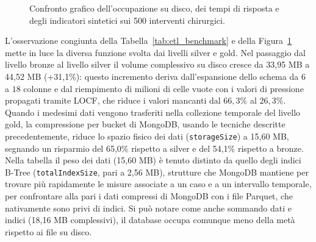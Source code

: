 \begin{table}[ht]
\centering
{}
\caption{Confronto sperimentale di spazio su disco, latenza di interrogazione e valori mancanti sui 500 casi clinici.}
\label{tab:etl_benchmark}
\end{table}

\begin{figure}[!htbp]
    \centering
    \resizebox{\textwidth}{!}{}
    \caption{Confronto grafico dell'occupazione su disco, dei tempi di risposta e degli indicatori sintetici sui 500 interventi chirurgici.}
    \label{fig:etl_benchmark}
\end{figure}

L'osservazione congiunta della Tabella~\ref{tab:etl_benchmark} e della Figura~\ref{fig:etl_benchmark} mette in luce la diversa funzione svolta dai livelli silver e gold. Nel passaggio dal livello bronze al livello silver il volume complessivo su disco cresce da 33,95 MB a 44,52 MB (+31,1\%): questo incremento deriva dall'espansione dello schema da $6$ a $18$ colonne e dal riempimento di milioni di celle vuote con i valori di pressione propagati tramite LOCF, che riduce i valori mancanti dal $66,3\%$ al $26,3\%$. Quando i medesimi dati vengono trasferiti nella collezione temporale del livello gold, la compressione per bucket di MongoDB, usando le tecniche descritte precedentemente, riduce lo spazio fisico dei dati (\texttt{storageSize}) a 15,60 MB, segnando un risparmio del 65,0\% rispetto a silver e del 54,1\% rispetto a bronze. Nella tabella il peso dei dati (15,60 MB) \`e tenuto distinto da quello degli indici B-Tree (\texttt{totalIndexSize}, pari a 2,56 MB), strutture che MongoDB mantiene per trovare pi\`u rapidamente le misure associate a un caso e a un intervallo temporale, per confrontare alla pari i dati compressi di MongoDB con i file Parquet, che nativamente sono privi di indici. Si pu\`o notare come anche sommando dati e indici (18,16 MB complessivi), il database occupa comunque meno della met\`a rispetto ai file su disco.

